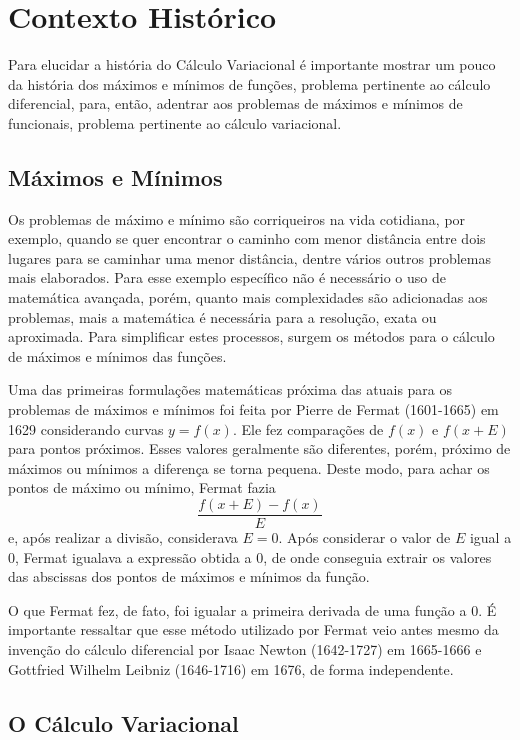 \chapter{Contexto Histórico}

Para elucidar a história do Cálculo Variacional é importante mostrar um pouco da história dos máximos e mínimos de funções, problema pertinente ao cálculo diferencial, para, então, adentrar aos problemas de máximos e mínimos de funcionais, problema pertinente ao cálculo variacional.

\section{Máximos e Mínimos}

Os problemas de máximo e mínimo são corriqueiros na vida cotidiana, por exemplo, quando se quer encontrar o caminho com menor distância entre dois lugares para se caminhar uma menor distância, dentre vários outros problemas mais elaborados. Para esse exemplo específico não é necessário o uso de matemática avançada, porém, quanto mais complexidades são adicionadas aos problemas, mais a matemática é necessária para a resolução, exata ou aproximada. Para simplificar estes processos, surgem os métodos para o cálculo de máximos e mínimos das funções.

Uma das primeiras formulações matemáticas próxima das atuais para os problemas de máximos e mínimos foi feita por Pierre de Fermat (1601-1665) em 1629 considerando curvas $y=f(x)$. Ele fez comparações de $f(x)$ e $f(x+E)$ para pontos próximos. Esses valores geralmente são diferentes, porém, próximo de máximos ou mínimos a diferença se torna pequena. Deste modo, para achar os pontos de máximo ou mínimo, Fermat fazia $$\frac{f(x+E)-f(x)}{E}$$ e, após realizar a divisão, considerava $E=0$. Após considerar o valor de $E$ igual a $0$, Fermat igualava a expressão obtida a $0$, de onde conseguia extrair os valores das abscissas dos pontos de máximos e mínimos da função. \cite{boyer}

O que Fermat fez, de fato, foi igualar a primeira derivada de uma função a $0$. É importante ressaltar que esse método utilizado por Fermat veio antes mesmo da invenção do cálculo diferencial por Isaac Newton (1642-1727) em 1665-1666 e Gottfried Wilhelm Leibniz (1646-1716) em 1676, de forma independente. \cite{boyer}

\section{O Cálculo Variacional}

